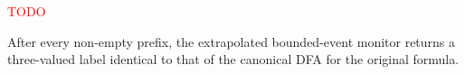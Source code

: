 \textcolor{red}{TODO}

\begin{theorem}
\label{thm:rulerunner-bounded-online}
After every non-empty prefix, the extrapolated bounded-event monitor returns a
three-valued label identical to that of the canonical DFA for the original
formula.
\end{theorem}




